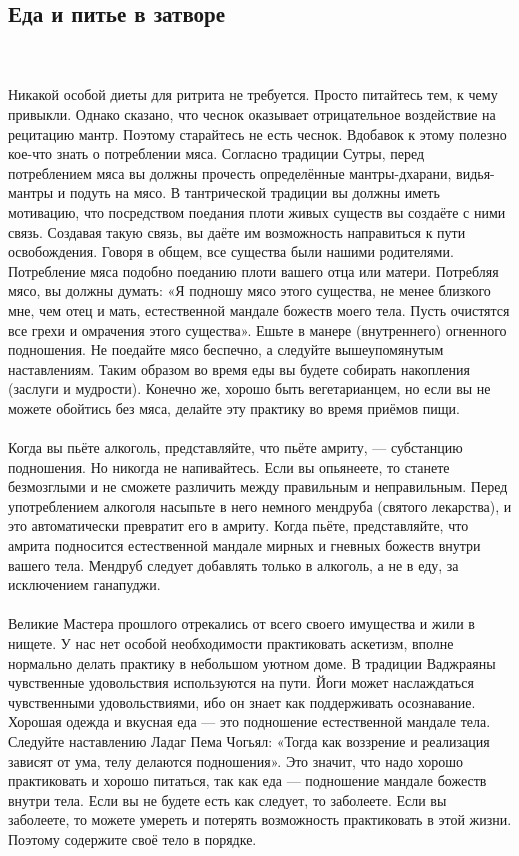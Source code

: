 \subsection{Еда и питье в затворе}
\\ \\ Никакой особой диеты для ритрита не требуется. Просто питайтесь тем, к чему привыкли. Однако сказано, что чеснок оказывает отрицательное воздействие на рецитацию мантр. Поэтому старайтесь не есть чеснок. Вдобавок к этому полезно кое-что знать о потреблении мяса. Согласно традиции Сутры, перед потреблением мяса вы должны прочесть определённые мантры-дхарани, видья-мантры и подуть на мясо. В тантрической традиции вы должны иметь мотивацию, что посредством поедания плоти живых существ вы создаёте с ними связь. Создавая такую связь, вы даёте им возможность направиться к пути освобождения. Говоря в общем, все существа были нашими родителями. Потребление мяса подобно поеданию плоти вашего отца или матери. Потребляя мясо, вы должны думать: «Я подношу мясо этого существа, не менее близкого мне, чем отец и мать, естественной мандале божеств моего тела. Пусть очистятся все грехи и омрачения этого существа». Ешьте в манере (внутреннего) огненного подношения. Не поедайте мясо беспечно, а следуйте вышеупомянутым наставлениям. Таким образом во время еды вы будете собирать накопления (заслуги и мудрости). Конечно же, хорошо быть вегетарианцем, но если вы не можете обойтись без мяса, делайте эту практику во время приёмов пищи.
\\ \\ Когда вы пьёте алкоголь, представляйте, что пьёте амриту, — субстанцию подношения. Но никогда не напивайтесь. Если вы опьянеете, то станете безмозглыми и не сможете различить между правильным и неправильным. Перед употреблением алкоголя насыпьте в него немного мендруба (святого лекар\-ства), и это автоматически превратит его в амриту. Когда пьёте, представляйте, что амрита подносится естественной мандале мирных и гневных божеств внутри вашего тела. Мендруб следует добавлять только в алкоголь, а не в еду, за исключением ганапуджи.
\\ \\ Великие Мастера прошлого отрекались от всего своего имущества и жили в нищете. У нас нет особой необходимости практиковать аскетизм, вполне нормально делать практику в небольшом уютном доме. В традиции Ваджраяны чувственные удовольствия используются на пути. Йоги может наслаждаться чувственными удовольствиями, ибо он знает как поддерживать осознавание. Хорошая одежда и вкусная еда — это подношение естественной мандале тела. Следуйте наставлению Ладаг Пема Чогьял: «Тогда как воззрение и реализация зависят от ума, телу делаются подношения». Это значит, что надо хорошо практиковать и хорошо питаться, так как еда — подношение мандале божеств внутри тела. Если вы не будете есть как следует, то заболеете. Если вы заболеете, то можете умереть и потерять возможность практиковать в этой жизни. Поэтому содержите своё тело в порядке.
